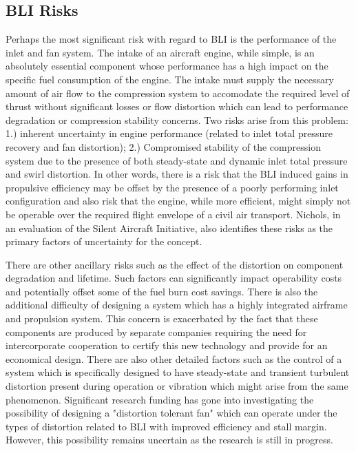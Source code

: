 \documentclass[12pt]{gatech-thesis}
\begin{document}
\subsection{BLI Risks}

Perhaps the most significant risk with regard to BLI is the performance of the inlet and fan system.  The intake of an aircraft engine, while simple, is an absolutely essential component whose performance has a high impact on the specific fuel consumption of the engine.  The intake must supply the necessary amount of air flow to the compression system to accomodate the required level of thrust without significant losses or flow distortion which can lead to performance degradation or compression stability concerns. Two risks arise from this problem: 1.) inherent uncertainty in engine performance (related to inlet total pressure recovery and fan distortion); 2.) Compromised stability of the compression system due to the presence of both steady-state and dynamic inlet total pressure and swirl distortion.  In other words, there is a risk that the BLI induced gains in propulsive efficiency may be offset by the presence of a poorly performing inlet configuration and also risk that the engine, while more efficient, might simply not be operable over the required flight envelope of a civil air transport. Nichols, in an evaluation of the Silent Aircraft Initiative, also identifies these risks as the primary factors of uncertainty for the concept.  

There are other ancillary risks such as the effect of the distortion on component degradation and lifetime. Such factors can significantly impact operability costs and potentially offset some of the fuel burn cost savings. There is also the additional difficulty of designing a system which has a highly integrated airframe and propulsion system. This concern is exacerbated by the fact that these components are produced by separate companies requiring the need for intercorporate cooperation to certify this new technology and provide for an economical design. There are also other detailed factors such as the control of a system which is specifically designed to have steady-state and transient turbulent distortion present during operation or vibration which might arise from the same phenomenon. Significant research funding has gone into investigating the possibility of designing a "distortion tolerant fan" which can operate under the types of distortion related to BLI with improved efficiency and stall margin. However, this possibility remains uncertain as the research is still in progress.
\end{document}
